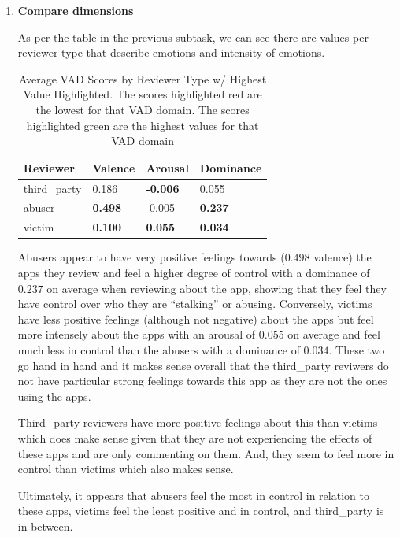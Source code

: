 \documentclass[12pt]{article}
\begin{document}
\begin{enumerate}
    \item \textbf{Compare dimensions}
    
    As per the table in the previous subtask, we can see there are values per reviewer type that 
    describe emotions and intensity of emotions. 

    \begin{table}[H]
        \centering
        \renewcommand{\arraystretch}{1.4}
        \begin{tabular}{p{4cm} p{3cm} p{3cm} p{3cm}}
            \toprule
            \rowcolor{tableheader}
            \color{white}\textbf{Reviewer} & \color{white}\textbf{Valence} & \color{white}\textbf{Arousal} & \color{white}\textbf{Dominance} \\
            \midrule
            \rowcolor{rowalt} third\_party & 0.186 & \cellcolor{red!13}\textbf{-0.006} & 0.055 \\
                              abuser & \cellcolor{green!13}\textbf{0.498} & -0.005 & \cellcolor{green!13}\textbf{0.237} \\
            \rowcolor{rowalt} victim & \cellcolor{red!13}\textbf{0.100} & \cellcolor{green!13}\textbf{0.055} & \cellcolor{red!13}\textbf{0.034} \\
            \bottomrule
        \end{tabular}
        \caption{Average VAD Scores by Reviewer Type w/ Highest Value Highlighted. 
        The scores highlighted red are the lowest for that VAD domain. 
        The scores highlighted green are the highest values for that VAD domain}
        \label{tab:vad-averages-highlighted}
    \end{table}

    Abusers appear to have very positive feelings towards ($0.498$ valence) the apps they review and feel a higher 
    degree of control with a dominance of $0.237$ on average when reviewing about the app, showing that they feel they 
    have control over who they are ``stalking'' or abusing. Conversely, victims have less positive feelings (although not negative) 
    about the apps but feel more intensely about the apps with an arousal of $0.055$ on average and feel much less in control than 
    the abusers with a dominance of $0.034$. These two go hand in hand and it makes sense overall that the third\_party reviwers do not have particular strong 
    feelings towards this app as they are not the ones using the apps. 

    Third\_party reviewers have more positive feelings about this than victims which does make sense given that 
    they are not experiencing the effects of these apps and are only commenting on them. And, they seem to feel 
    more in control than victims which also makes sense.

    Ultimately, it appears that abusers feel the most in control in relation to these apps, victims feel the 
    least positive and in control, and third\_party is in between.

\end{enumerate}
\end{document}
